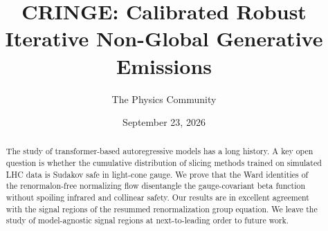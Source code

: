 \documentclass[11pt]{article}
\title{CRINGE: Calibrated Robust Iterative Non-Global Generative Emissions}
\author{The Physics Community}
\date{September 23, 2026}
\numberwithin{equation}{section}
\theoremstyle{definition}
\theoremstyle{remark}
\begin{document}
\maketitle
\begin{abstract}
The study of transformer-based autoregressive models has a long history.
A key open question is whether the cumulative distribution of slicing
methods trained on simulated LHC data is Sudakov safe in light-cone
gauge. We prove that the Ward identities of the renormalon-free
normalizing flow disentangle the gauge-covariant beta function without
spoiling infrared and collinear safety. Our results are in excellent
agreement with the signal regions of the resummed renormalization group
equation. We leave the study of model-agnostic signal regions at
next-to-leading order to future work.
\end{abstract}
\tableofcontents






\nocite{*}


\end{document}
